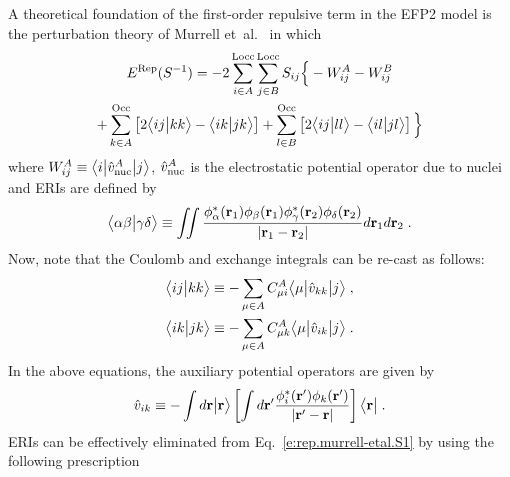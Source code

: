 \documentclass[aip,jcp,amsmath,amssymb,preprint,floatfix]{revtex4-1}
\begin{document}
A theoretical foundation of the
first\hyp{}order repulsive term in the EFP2 model
is the perturbation theory of
Murrell et~al.~\cite{Murrell.Randic.Williams.Longuet-Higgins.ProcRSocLondA.1965} 
in which
%
\begin{multline} \label{e:rep.murrell-etal.S1}
    E^{\rm Rep}(S^{-1}) = -2\sum_{i\in A}^{\rm Locc} \sum_{j\in B}^{\rm Locc}
               S_{ij} \Big\{
         - W^A_{ij} 
         - W^B_{ij} \\
 + \sum_{k\in A}^{\rm Occ} \left[ 2\BraKet{ij}{kk} - \BraKet{ik}{jk} \right] 
 + \sum_{l\in B}^{\rm Occ} \left[ 2\BraKet{ij}{ll} - \BraKet{il}{jl} \right]
                \Big\}
\end{multline}
%
where $W^A_{ij} \equiv \tBraKet{i}{\hat{v}^A_{\rm nuc}}{j}$,
$\hat{v}^A_{\rm nuc}$
is the electrostatic potential operator due to nuclei
and
ERIs are defined by
%
\begin{equation} \label{e:eri}
	\BraKet{\alpha\beta}{\gamma\delta} \equiv
	\iint 
	\frac{ \phi_\alpha^{*}({\bf r}_1) \phi_\beta({\bf r}_1) 
	       \phi_\gamma^{*}({\bf r}_2) \phi_\delta({\bf r}_2) }{ \vert {\bf r}_1 - {\bf r}_2 \vert}
	d{\bf r}_1 d{\bf r}_2  \;.
\end{equation}
%
Now, note that the Coulomb and exchange integrals can be re\hyp{}cast as follows:
%
\begin{subequations}
 \begin{align}
 \BraKet{ij}{kk} &\equiv - \sum_{\mu\in A} 
     C_{\mu i}^A \tBraKet{\mu}{\hat{v}_{kk}}{j} \;, \\
 \BraKet{ik}{jk} &\equiv - \sum_{\mu\in A} 
     C_{\mu k}^A \tBraKet{\mu}{\hat{v}_{ik}}{j} \;.
 \end{align}
\end{subequations}
%
%
%
In the above equations, the auxiliary potential operators are given by
%
\begin{equation}
  \hat{v}_{ik} \equiv - \int d{\bf r} \Ket{{\bf r}} 
        \left[
        \int d{\bf r}' \frac{\phi_i^{*}({\bf r}') \phi_k({\bf r}')}{\vert {\bf r}' - {\bf r}\vert}
        \right] \Bra{{\bf r}} \;.
\end{equation}
%
ERIs can be effectively eliminated from Eq.~\eqref{e:rep.murrell-etal.S1} 
by using the following prescription~\cite{Blasiak.Bednarska.Choluj.Bartkowiak.JCP.2019}
\end{document}
